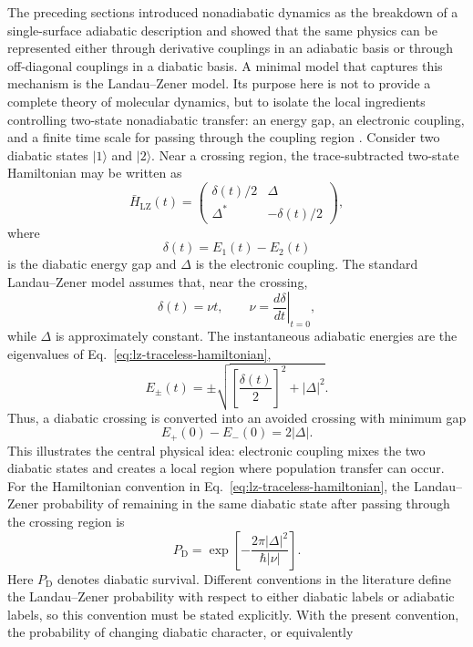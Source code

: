 \documentclass[
  11pt,
  letterpaper,
  onehalfspacing,
  normalmargins,
  equalmargins,
  oneside
]{ut-thesis}
\begin{document}
The preceding sections introduced nonadiabatic dynamics as the breakdown of a single-surface adiabatic description and showed that the same physics can be represented either through derivative couplings in an adiabatic basis or through off-diagonal couplings in a diabatic basis. A minimal model that captures this mechanism is the Landau--Zener model. Its purpose here is not to provide a complete theory of molecular dynamics, but to isolate the local ingredients controlling two-state nonadiabatic transfer: an energy gap, an electronic coupling, and a finite time scale for passing through the coupling region \cite{Landau1932,Zener1932,Stueckelberg1932,Majorana1932,Wittig2005,Nakamura2002}. Consider two diabatic states \(|1\rangle\) and \(|2\rangle\). Near a crossing region, the trace-subtracted two-state Hamiltonian may be written as \begin{equation} \bar H_{\mathrm{LZ}}(t) = \begin{pmatrix} \delta(t)/2 & \Delta \\ \Delta^\ast & -\delta(t)/2 \end{pmatrix}, \label{eq:lz-traceless-hamiltonian} \end{equation} where \begin{equation} \delta(t)=E_1(t)-E_2(t) \label{eq:lz-diabatic-energy-gap} \end{equation} is the diabatic energy gap and \(\Delta\) is the electronic coupling. The standard Landau--Zener model assumes that, near the crossing, \begin{equation} \delta(t)=\nu t, \qquad \nu=\left.\frac{d\delta}{dt}\right|_{t=0}, \label{eq:lz-linear-gap} \end{equation} while \(\Delta\) is approximately constant. The instantaneous adiabatic energies are the eigenvalues of Eq.~\eqref{eq:lz-traceless-hamiltonian}, \begin{equation} E_{\pm}(t) = \pm \sqrt{ \left[\frac{\delta(t)}{2}\right]^2 + |\Delta|^2 }. \label{eq:lz-adiabatic-energies} \end{equation} Thus, a diabatic crossing is converted into an avoided crossing with minimum gap \begin{equation} E_+(0)-E_-(0)=2|\Delta|. \label{eq:lz-minimum-gap} \end{equation} This illustrates the central physical idea: electronic coupling mixes the two diabatic states and creates a local region where population transfer can occur. For the Hamiltonian convention in Eq.~\eqref{eq:lz-traceless-hamiltonian}, the Landau--Zener probability of remaining in the same diabatic state after passing through the crossing region is \begin{equation} P_{\mathrm D} = \exp \left[ - \frac{2\pi |\Delta|^2} {\hbar |\nu|} \right]. \label{eq:lz-diabatic-survival-probability} \end{equation} Here \(P_{\mathrm D}\) denotes diabatic survival. Different conventions in the literature define the Landau--Zener probability with respect to either diabatic labels or adiabatic labels, so this convention must be stated explicitly. With the present convention, the probability of changing diabatic character, or equivalently 
\end{document}
